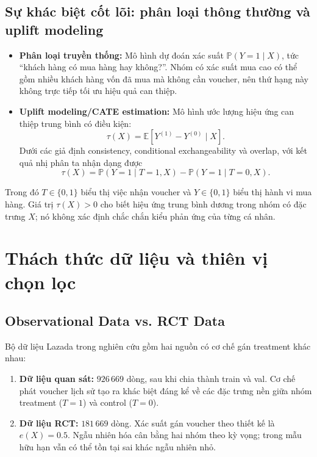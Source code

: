 \documentclass[11pt,a4paper]{article}
\newcommand{\Exp}{\mathbb{E}}
\newcommand{\Prob}{\mathbb{P}}
\DeclareRobustCommand{\code}[1]{{\small\texttt{#1}}}
\def\code#1{#1}%
\begin{document}
\subsection{Sự khác biệt cốt lõi: phân loại thông thường và uplift modeling}
\begin{itemize}
    \item \textbf{Phân loại truyền thống:} Mô hình dự đoán xác suất
    $\Prob(Y=1\mid X)$, tức ``khách hàng có mua hàng hay không?''. Nhóm có
    xác suất mua cao có thể gồm nhiều khách hàng vốn đã mua mà không cần
    voucher, nên thứ hạng này không trực tiếp tối ưu hiệu quả can thiệp.
    \item \textbf{Uplift modeling/CATE estimation:} Mô hình ước lượng hiệu
    ứng can thiệp trung bình có điều kiện:
    \[
        \tau(X)=\Exp\!\left[Y^{(1)}-Y^{(0)}\mid X\right].
    \]
    Dưới các giả định consistency, conditional exchangeability và overlap,
    với kết quả nhị phân ta nhận dạng được
    \[
        \tau(X)=\Prob(Y=1\mid T=1,X)-\Prob(Y=1\mid T=0,X).
    \]
\end{itemize}
Trong đó $T\in\{0,1\}$ biểu thị việc nhận voucher và $Y\in\{0,1\}$ biểu
thị hành vi mua hàng. Giá trị $\tau(X)>0$ cho biết hiệu ứng trung bình dương
trong nhóm có đặc trưng $X$; nó không xác định chắc chắn kiểu phản ứng của
từng cá nhân.

\section{Thách thức dữ liệu và thiên vị chọn lọc}

\subsection{Observational Data vs. RCT Data}
Bộ dữ liệu Lazada trong nghiên cứu gồm hai nguồn có cơ chế gán treatment
khác nhau:
\begin{enumerate}
    \item \textbf{Dữ liệu quan sát:} $926\,669$ dòng, sau khi chia thành
    \code{train} và \code{val}. Cơ chế phát voucher lịch sử tạo ra khác biệt
    đáng kể về các đặc trưng nền giữa nhóm treatment ($T=1$) và control
    ($T=0$).
    \item \textbf{Dữ liệu RCT:} $181\,669$ dòng. Xác suất gán voucher theo
    thiết kế là $e(X)=0.5$. Ngẫu nhiên hóa cân bằng hai nhóm theo kỳ vọng;
    trong mẫu hữu hạn vẫn có thể tồn tại sai khác ngẫu nhiên nhỏ.
\end{enumerate}
\end{document}
